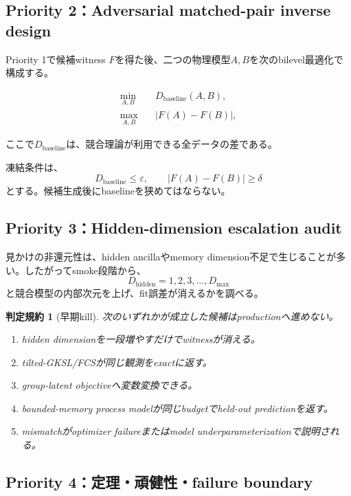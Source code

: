 \documentclass[11pt,a4paper,uplatex,dvipdfmx]{bxjsarticle}
\newtheorem{criterion}[definition]{判定規約}
\theoremstyle{remark}
\newcommand{\eps}{\varepsilon}
\begin{document}
\subsection{Priority 2：Adversarial matched-pair inverse design}

Priority 1で候補witness $F$を得た後、二つの物理模型$A,B$を次のbilevel最適化で構成する。

\begin{align}
\min_{A,B}\quad
& D_{\mathrm{baseline}}(A,B),\\
\max_{A,B}\quad
& |F(A)-F(B)|,
\end{align}

ここで$D_{\mathrm{baseline}}$は、競合理論が利用できる全データの差である。

凍結条件は、
\begin{equation}
D_{\mathrm{baseline}}\le\eps,
\qquad
|F(A)-F(B)|\ge\delta
\end{equation}
とする。候補生成後にbaselineを狭めてはならない。

\subsection{Priority 3：Hidden-dimension escalation audit}

見かけの非還元性は、hidden ancillaやmemory dimension不足で生じることが多い。したがってsmoke段階から、
\begin{equation}
D_{\mathrm{hidden}}=1,2,3,\ldots,D_{\max}
\end{equation}
と競合模型の内部次元を上げ、fit誤差が消えるかを調べる。

\begin{criterion}[早期kill]
次のいずれかが成立した候補はproductionへ進めない。
\begin{enumerate}
  \item hidden dimensionを一段増やすだけでwitnessが消える。
  \item tilted-GKSL/FCSが同じ観測をexactに返す。
  \item group-latent objectiveへ変数変換できる。
  \item bounded-memory process modelが同じbudgetでheld-out predictionを返す。
  \item mismatchがoptimizer failureまたはmodel underparameterizationで説明される。
\end{enumerate}
\end{criterion}

\subsection{Priority 4：定理・頑健性・failure boundary}
\end{document}
